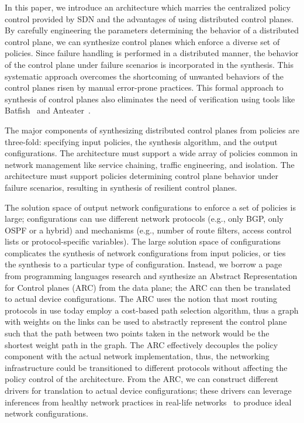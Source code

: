 In this paper, we introduce an architecture which marries the centralized
policy control provided by SDN and the advantages of using
distributed control planes. 
By carefully engineering the parameters determining the
behavior of a distributed control plane, 
we can synthesize control planes which
enforce a diverse set of policies. 
Since failure handling is 
performed in a distributed manner, the behavior of the control
plane under failure scenarios is incorporated in the synthesis. 
This systematic approach overcomes the shortcoming of unwanted
behaviors of the control planes risen by manual error-prone
practices. This
formal approach to synthesis of control planes also eliminates the need of 
verification using tools like Batfish~\cite{batfish} and Anteater~\cite{anteater}.

The major components of synthesizing distributed control planes from 
policies are three-fold: specifying input policies, the synthesis 
algorithm, and the output configurations. The architecture must 
support a wide array of policies common in network management like service
chaining, traffic engineering, and isolation. The architecture must
support policies determining control plane behavior under failure scenarios,
resulting in synthesis of resilient control planes. 

The solution space of output network configurations to enforce a set of policies
is large; configurations can use different 
network protocols (e.g., only BGP, only OSPF or a hybrid) and
mechanisms (e.g., number of route filters, access control lists
or protocol-specific variables). The large solution space
of configurations complicates the synthesis of
network configurations from
input policies, 
or ties the synthesis to a particular type of configuration. 
Instead, we borrow a page from programming languages
research and
synthesize an Abstract Representation for Control planes (ARC) from 
the data plane; the ARC can then be translated to actual device configurations.
The ARC uses the notion that most routing protocols in use 
today employ a cost-based path selection algorithm, thus a graph with
weights on the links can be used to abstractly represent the control plane such that 
the path between two points taken in the network would be 
the shortest weight path in the graph. 
The ARC effectively decouples the policy component with the 
actual network implementation, thus, the networking infrastructure could be
transitioned to different protocols without affecting the policy 
control of the architecture. From the ARC, we can construct different
drivers for translation to actual device configurations; these drivers
can leverage inferences from healthy network practices in 
real-life networks~\cite{mpa-imc15} to produce ideal network configurations.

